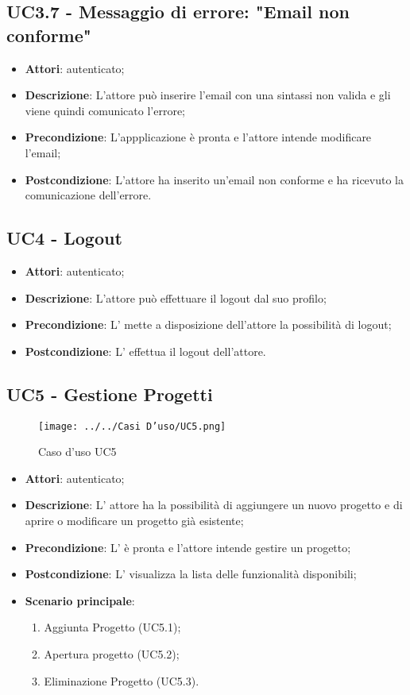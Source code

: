 \subsection{UC3.7 - Messaggio di errore: "Email non conforme"}
\label{ssec:UC3.7}
\begin{itemize}
\item \textbf{Attori}:  autenticato;
\item \textbf{Descrizione}: L'attore può inserire l'email con una sintassi non valida e gli viene quindi comunicato l'errore;
\item \textbf{Precondizione}: L'appplicazione è pronta e l'attore intende modificare l'email;
\item \textbf{Postcondizione}: L'attore ha inserito un'email non conforme e ha ricevuto la comunicazione dell'errore.
\end{itemize}
\newpage
\subsection{UC4 - Logout}
\label{ssec:UC4}
\begin{itemize}
\item \textbf{Attori}:  autenticato;
\item \textbf{Descrizione}: L'attore può effettuare il logout dal suo profilo;
\item \textbf{Precondizione}: L’ mette a disposizione dell’attore la possibilità di logout;
\item \textbf{Postcondizione}: L' effettua il logout dell'attore.
\end{itemize}
\newpage
\subsection{UC5 - Gestione Progetti}
\label{ssec:UC5}
\begin{figure}[h!]
\centering
\texttt{[image: ../../Casi D'uso/UC5.png]}
\caption{Caso d'uso UC5}
 \end{figure}
\begin{itemize}
\item \textbf{Attori}:  autenticato;
\item \textbf{Descrizione}: L’ attore ha la possibilità di aggiungere un nuovo progetto e di aprire o modificare un progetto già esistente;
\item \textbf{Precondizione}: L' è pronta e l'attore intende gestire un progetto;
\item \textbf{Postcondizione}: L’  visualizza la lista delle funzionalità disponibili;
\item \textbf{Scenario principale}: \begin{enumerate}\item Aggiunta Progetto (UC5.1);\item Apertura progetto (UC5.2);\item Eliminazione Progetto (UC5.3).
 \end{enumerate}
\end{itemize}
\newpage
